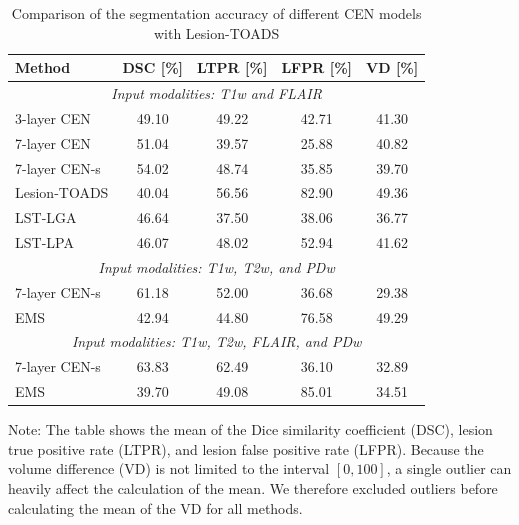 \begin{table}
\begin{center}
\caption{Comparison of the segmentation accuracy of different CEN models with
Lesion-TOADS}
\label{tab:results1}
\begin{tabular}{@{}lcccc@{}}
\toprule
Method & DSC [\%] & LTPR [\%] & LFPR [\%] & VD [\%] \\
\midrule
\multicolumn{5}{c}{\textit{Input modalities: T1w and FLAIR}} \\
\midrule
3-layer CEN \cite{brosch2015} & 49.10 & 49.22 & 42.71 & 41.30 \\
7-layer CEN & 51.04 & 39.57 & 25.88 & 40.82 \\ 
7-layer CEN-s & 54.02 & 48.74 & 35.85 & 39.70 \\[0.2em]
Lesion-TOADS \cite{shiee2010topology} & 40.04 & 56.56 & 82.90 & 49.36 \\ 
LST-LGA \cite{schmidt2012automated} & 46.64 & 37.50 & 38.06 & 36.77 \\
LST-LPA \cite{schmidt2012automated} & 46.07 & 48.02 & 52.94 & 41.62 \\
\midrule
\multicolumn{5}{c}{\textit{Input modalities: T1w, T2w, and PDw}} \\
\midrule
7-layer CEN-s & 61.18 & 52.00 & 36.68 & 29.38 \\
EMS \cite{vanleemput2001} & 42.94 & 44.80 & 76.58 & 49.29 \\
\midrule
\multicolumn{5}{c}{\textit{Input modalities: T1w, T2w, FLAIR, and PDw}} \\
\midrule
7-layer CEN-s & 63.83 & 62.49 & 36.10 & 32.89 \\
EMS \cite{vanleemput2001} & 39.70 & 49.08 & 85.01 & 34.51 \\
\bottomrule
\end{tabular}
\end{center}
Note: The table shows the mean of the Dice similarity coefficient (DSC), lesion
true positive rate (LTPR), and lesion false positive rate (LFPR). Because
the volume difference (VD) is not limited to the interval $[0, 100]$, a
single outlier can heavily affect the calculation of the mean. We therefore
excluded outliers before calculating the mean of the VD for all methods.
\end{table}

